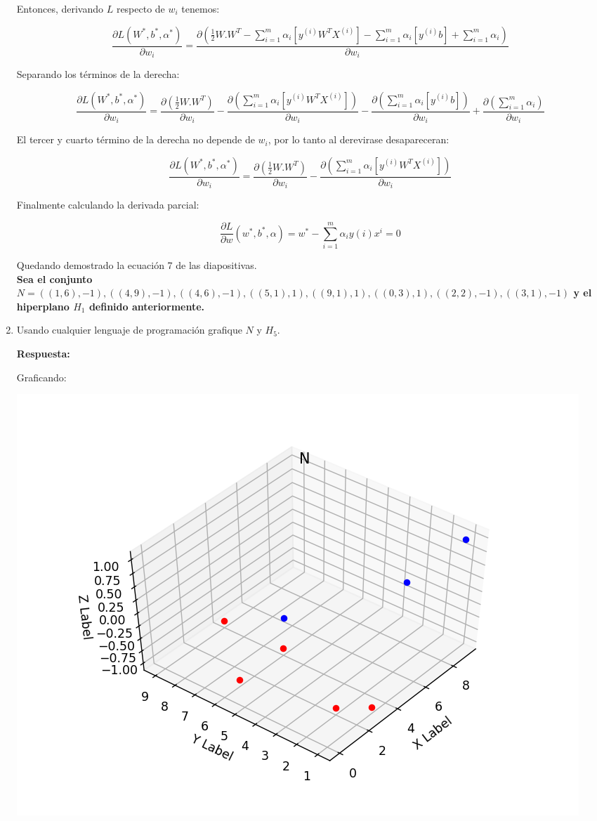 \documentclass[paper=a4, fontsize=11pt]{scrartcl}
\numberwithin{equation}{section}		%
\numberwithin{figure}{section}			%
\numberwithin{table}{section}				%
\begin{document}
\begin{enumerate}
    Entonces, derivando $L$ respecto de $w_i$ tenemos:
    
    $$\frac{\partial L(W^*, b^*, \alpha^* )}{\partial w_i}=\frac{\partial (\frac{1}{2}W.W^T - \sum_{i=1}^{m}\alpha_i[y^{(i)}W^{T}X^{(i)}] - \sum_{i=1}^{m}\alpha_i[y^{(i)}b] + \sum_{i=1}^{m}\alpha_i)}{\partial w_i}$$
    
    Separando los términos de la derecha:
    
    $$\frac{\partial L(W^*, b^*, \alpha^* )}{\partial w_i}=\frac{\partial (\frac{1}{2}W.W^T)}{\partial w_i} - \frac{\partial (\sum_{i=1}^{m}\alpha_i[y^{(i)}W^{T}X^{(i)}])}{\partial w_i} - \frac{\partial (\sum_{i=1}^{m}\alpha_i[y^{(i)}b])}{\partial w_i}+ \frac{\partial (\sum_{i=1}^{m}\alpha_i)}{\partial w_i}$$
    
    El tercer y cuarto término de la derecha no depende de $w_i$, por lo tanto al derevirase desapareceran:
    
    $$\frac{\partial L(W^*, b^*, \alpha^* )}{\partial w_i}=\frac{\partial (\frac{1}{2}W.W^T)}{\partial w_i} - \frac{\partial (\sum_{i=1}^{m}\alpha_i[y^{(i)}W^{T}X^{(i)}])}{\partial w_i}$$
    
    Finalmente calculando la derivada parcial:
    
    $$\frac{\partial L}{\partial w}(w^*, b^*, \alpha) = w^* - \sum_{i=1}^{m}\alpha_iy(i)x^{i}=0$$
    
    Quedando demostrado la ecuación 7 de las diapositivas.\\
    

\textbf{Sea el conjunto $N = {((1,6),-1), ((4,9),-1), ((4,6),-1), ((5,1),1), ((9,1),1), ((0,3),1), ((2,2),-1), ((3,1),-1)}$ y el hiperplano $H_1$ definido anteriormente.}\\

    \item Usando cualquier lenguaje de programación grafique $N$ y $H_5$.
    
    \textbf{Respuesta:}
    
    Graficando:
        
    \includegraphics[scale=0.4]{N}
    

\end{enumerate}
\end{document}

